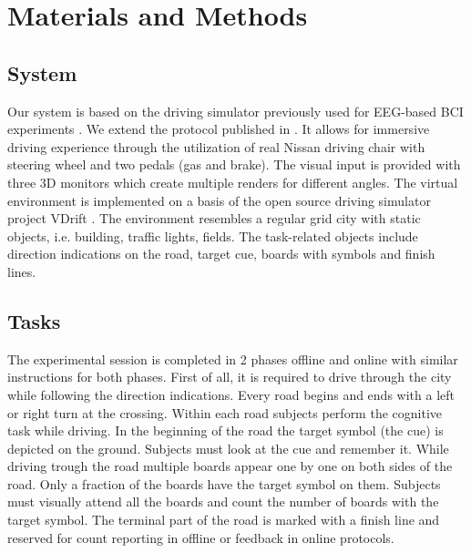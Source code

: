 \documentclass[12pt]{iopart}
\begin{document}




\section{Materials and Methods}
\label{sec:methods}

\subsection{System}
Our system is based on the driving simulator previously used for
EEG-based BCI experiments \cite{khaliliardali_action_2015,zhang_eeg-based_2015}.
We extend the protocol published in \cite{renold_eeg_2014}.
It allows for immersive driving experience through the utilization
of real Nissan driving chair with steering wheel and two pedals (gas and brake).
The visual input is provided with three 3D monitors which create multiple renders for
different angles. The virtual environment is implemented on a basis of
the open source driving simulator project VDrift \cite{noauthor_about_nodate}.
The environment resembles a regular grid city with static objects, i.e.
building, traffic lights, fields. The task-related objects include
direction indications on the road, target cue, boards with symbols
and finish lines. 

\subsection{Tasks}
The experimental session is completed in 2 phases offline and online
with similar instructions for both phases.
First of all, it is required to drive through the city while
following the direction indications.
Every road begins and ends with a left or right turn at the crossing.
Within each road subjects perform the cognitive task while driving.
In the beginning of the road the target symbol (the cue) is depicted
on the ground. Subjects must look at the cue and remember it.
While driving trough the road multiple boards appear one by one
on both sides of the road. Only a fraction of the boards have
the target symbol on them. Subjects must visually attend all the boards
and count the number of boards with the target symbol. 
The terminal part of the road is marked with a finish line and 
reserved for count reporting in offline or feedback in online protocols.
\end{document}
